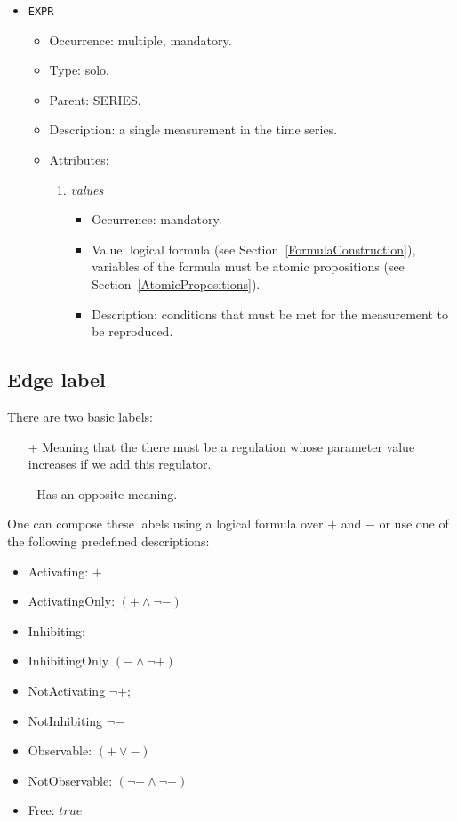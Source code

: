 \documentclass[12pt]{article}
\newenvironment{menum}{
\begin{enumerate}
  \setlength{\itemsep}{0pt}
  \setlength{\parskip}{0pt}
  \setlength{\parsep}{0pt}
}{\end{enumerate}}
\newenvironment{mitem}{
\begin{itemize}
  \setlength{\itemsep}{0pt}
  \setlength{\parskip}{0pt}
  \setlength{\parsep}{0pt}
}{\end{itemize}}
\begin{document}
\begin{mitem}
	\item \texttt{EXPR}
	\begin{mitem}
		\item Occurrence: multiple, mandatory.
		\item Type: solo.
		\item Parent: SERIES.
		\item Description: a single measurement in the time series.
		\item Attributes:	
		\begin{menum}
			\item \textit{values} 
			\begin{mitem}
				\item Occurrence: mandatory.
				\item Value: logical formula (see Section~\ref{FormulaConstruction}), variables of the formula must be atomic propositions (see Section~\ref{AtomicPropositions}).
				\item Description: conditions that must be met for the measurement to be reproduced.
			\end{mitem}
		\end{menum}
	\end{mitem}
\end{mitem}	

\subsection{Edge label}
\label{EdgeLabel}
There are two basic labels:
\begin{itemize}
\item [+]	Meaning that the there must be a regulation whose parameter value increases if we add this regulator.
\item [-]	Has an opposite meaning.
\end{itemize}
One can compose these labels using a logical formula over $+$ and $-$ or use one of the following predefined descriptions:
\begin{itemize}
\item Activating: $+$
\item ActivatingOnly: $(+ \wedge \neg -)$
\item Inhibiting: $-$
\item InhibitingOnly $(- \wedge \neg +)$
\item NotActivating $\neg +$;
\item NotInhibiting $\neg -$
\item Observable: $(+ \vee -)$
\item NotObservable: $(\neg + \wedge \neg -)$
\item Free: $true$

\end{itemize}
\end{document}
